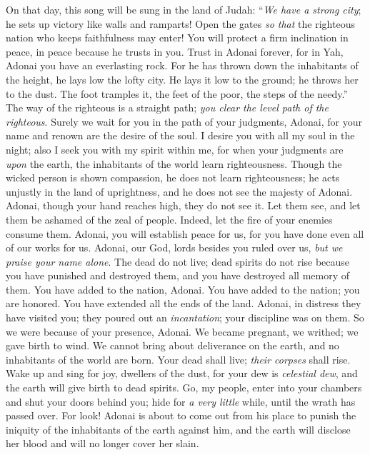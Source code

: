 \begin{biblechapter} %
 On that day, this song will be sung in the land of Judah: “\textit{We have a strong city}; 
he sets up victory like walls and ramparts!
\verse Open the gates \textit{so that} the righteous nation who keeps faithfulness may enter!
\verse You will protect a firm inclination in peace, 
in peace because he trusts in you.
\verse Trust in Adonai forever, 
for in Yah, Adonai you have an everlasting rock.
\verse For he has thrown down the inhabitants of the height, 
he lays low the lofty city. 
He lays it low to the ground; 
he throws her to the dust.
\verse The foot tramples it, 
the feet of the poor, the steps of the needy.”
 The way of the righteous is a straight path; 
\textit{you clear the level path of the righteous}.
\verse Surely we wait for you in the path of your judgments, Adonai, 
for your name and renown are the desire of the soul.
\verse I desire you with all my soul in the night; 
also I seek you with my spirit within me, 
for when your judgments are \textit{upon} the earth, 
the inhabitants of the world learn righteousness.
\verse Though the wicked person is shown compassion, he does not learn righteousness; he acts unjustly in the land of uprightness, 
and he does not see the majesty of Adonai.
\verse Adonai, though your hand reaches high, they do not see it.
\verse Let them see, and let them be ashamed of the zeal of people. 
Indeed, let the fire of your enemies consume them.
\verse Adonai, you will establish peace for us, 
for you have done even all of our works for us.
\verse Adonai, our God, lords besides you ruled over us, 
\textit{but we praise your name alone}.
\verse The dead do not live; 
dead spirits do not rise 
because you have punished and destroyed them, 
and you have destroyed all memory of them.
\verse You have added to the nation, Adonai. 
You have added to the nation; you are honored. 
You have extended all the ends of the land.
\verse Adonai, in distress they have visited you; 
they poured out an \textit{incantation}; 
your discipline was on them. So we were because of your presence, Adonai.
\verse We became pregnant, we writhed; 
we gave birth to wind. 
We cannot bring about deliverance on the earth, 
and no inhabitants of the world are born.
\verse Your dead shall live; \textit{their corpses} shall rise. 
Wake up and sing for joy, dwellers of the dust, 
for your dew is \textit{celestial dew}, 
and the earth will give birth to dead spirits.
\verse Go, my people, enter into your chambers 
and shut your doors behind you; 
hide for \textit{a very little} while, 
until the wrath has passed over.
\verse For look! Adonai is about to come out from his place 
to punish the iniquity of the inhabitants of the earth against him, 
and the earth will disclose her blood 
and will no longer cover her slain.
\end{biblechapter}


